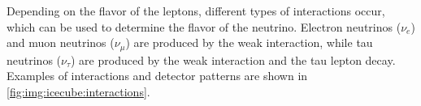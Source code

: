 

Depending on the flavor of the leptons,
  different types of interactions occur,
  which can be used to determine the flavor of the neutrino.
Electron neutrinos ($\nu_e$) and muon neutrinos ($\nu_\mu$) are produced by the weak interaction,
  while tau neutrinos ($\nu_\tau$) are produced by the weak interaction
  and the tau lepton decay.
Examples of interactions and detector patterns are shown in \autoref{fig:img:icecube:interactions}.



